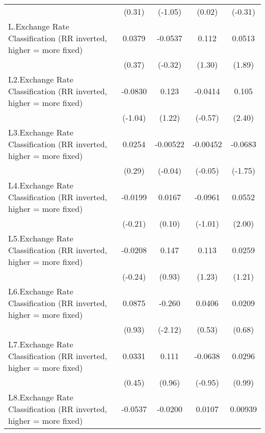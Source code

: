 {\begin{longtable}{l*{4}{c}}
                &   (0.31)         &  (-1.05)         &   (0.02)         &  (-0.31)         \\
\addlinespace
L.Exchange Rate Classification (RR inverted, higher = more fixed)&   0.0379         &  -0.0537         &    0.112         &   0.0513         \\
                &   (0.37)         &  (-0.32)         &   (1.30)         &   (1.89)         \\
\addlinespace
L2.Exchange Rate Classification (RR inverted, higher = more fixed)&  -0.0830         &    0.123         &  -0.0414         &    0.105\sym{*}  \\
                &  (-1.04)         &   (1.22)         &  (-0.57)         &   (2.40)         \\
\addlinespace
L3.Exchange Rate Classification (RR inverted, higher = more fixed)&   0.0254         & -0.00522         & -0.00452         &  -0.0683         \\
                &   (0.29)         &  (-0.04)         &  (-0.05)         &  (-1.75)         \\
\addlinespace
L4.Exchange Rate Classification (RR inverted, higher = more fixed)&  -0.0199         &   0.0167         &  -0.0961         &   0.0552\sym{*}  \\
                &  (-0.21)         &   (0.10)         &  (-1.01)         &   (2.00)         \\
\addlinespace
L5.Exchange Rate Classification (RR inverted, higher = more fixed)&  -0.0208         &    0.147         &    0.113         &   0.0259         \\
                &  (-0.24)         &   (0.93)         &   (1.23)         &   (1.21)         \\
\addlinespace
L6.Exchange Rate Classification (RR inverted, higher = more fixed)&   0.0875         &   -0.260\sym{*}  &   0.0406         &   0.0209         \\
                &   (0.93)         &  (-2.12)         &   (0.53)         &   (0.68)         \\
\addlinespace
L7.Exchange Rate Classification (RR inverted, higher = more fixed)&   0.0331         &    0.111         &  -0.0638         &   0.0296         \\
                &   (0.45)         &   (0.96)         &  (-0.95)         &   (0.99)         \\
\addlinespace
L8.Exchange Rate Classification (RR inverted, higher = more fixed)&  -0.0537         &  -0.0200         &   0.0107         &  0.00939         \\

\end{longtable}}
